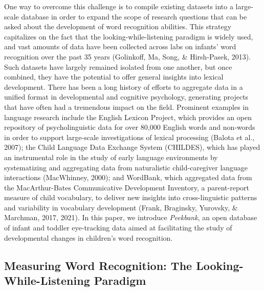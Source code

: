 \documentclass[
  english,
  man,floatsintext]{apa6}
\begin{document}
One way to overcome this challenge is to compile existing datasets into a large-scale database in order to expand the scope of research questions that can be asked about the development of word recognition abilities.
This strategy capitalizes on the fact that the looking-while-listening paradigm is widely used, and vast amounts of data have been collected across labs on infants' word recognition over the past 35 years (Golinkoff, Ma, Song, \& Hirsh-Pasek, 2013).
Such datasets have largely remained isolated from one another, but once combined, they have the potential to offer general insights into lexical development.
There has been a long history of efforts to aggregate data in a unified format in developmental and cognitive psychology, generating projects that have often had a tremendous impact on the field.
Prominent examples in language research include the English Lexicon Project, which provides an open repository of psycholinguistic data for over 80,000 English words and non-words in order to support large-scale investigations of lexical processing (Balota et al., 2007); the Child Language Data Exchange System (CHILDES), which has played an instrumental role in the study of early language environments by systematizing and aggregating data from naturalistic child-caregiver language interactions (MacWhinney, 2000); and WordBank, which aggregated data from the MacArthur-Bates Communicative Development Inventory, a parent-report measure of child vocabulary, to deliver new insights into cross-linguistic patterns and variability in vocabulary development (Frank, Braginsky, Yurovsky, \& Marchman, 2017, 2021).
In this paper, we introduce \emph{Peekbank}, an open database of infant and toddler eye-tracking data aimed at facilitating the study of developmental changes in children's word recognition.

\hypertarget{measuring-word-recognition-the-looking-while-listening-paradigm}{%
\subsection{Measuring Word Recognition: The Looking-While-Listening Paradigm}\label{measuring-word-recognition-the-looking-while-listening-paradigm}}
\end{document}
